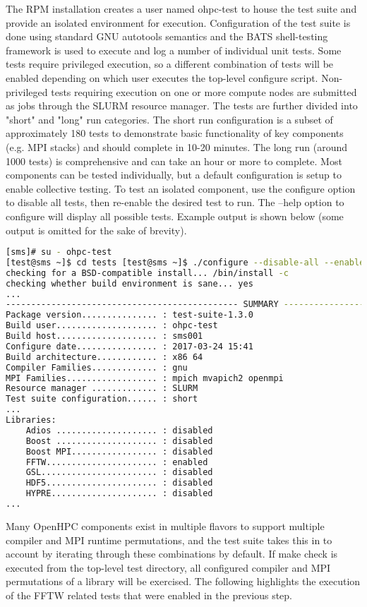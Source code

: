 The RPM installation creates a user named ohpc-test to house the test suite and provide an isolated environment for execution. Configuration of the test suite is done using standard GNU autotools semantics and the BATS shell-testing framework is used to execute and log a number of individual unit tests. Some tests require privileged execution, so a different combination of tests will be enabled depending on which user executes the top-level configure script. Non-privileged tests requiring execution on one or more compute nodes are submitted as jobs through the SLURM resource manager. The tests are further divided into "short" and "long" run categories. The short run configuration is a subset of approximately 180 tests to demonstrate basic functionality of key components (e.g. MPI stacks) and should complete in 10-20 minutes. The long run (around 1000 tests) is comprehensive and can take an hour or more to complete. Most components can be tested individually, but a default configuration is setup to enable collective testing. To test an isolated component, use the configure option to disable all tests, then re-enable the desired test to run. The --help option to configure will display all possible tests. Example output is shown below (some output is omitted for the sake of brevity).
\begin{lstlisting}[language=bash,keywords={},upquote=true]
[sms]# su - ohpc-test 
[test@sms ~]$ cd tests [test@sms ~]$ ./configure --disable-all --enable-fftw 
checking for a BSD-compatible install... /bin/install -c 
checking whether build environment is sane... yes 
... 
---------------------------------------------- SUMMARY --------------------------------------------
Package version............... : test-suite-1.3.0
Build user.................... : ohpc-test 
Build host.................... : sms001 
Configure date................ : 2017-03-24 15:41 
Build architecture............ : x86 64 
Compiler Families............. : gnu 
MPI Families.................. : mpich mvapich2 openmpi 
Resource manager ............. : SLURM 
Test suite configuration...... : short 
... 
Libraries: 
	Adios .................... : disabled 
	Boost .................... : disabled 
	Boost MPI................. : disabled 
	FFTW...................... : enabled 
	GSL....................... : disabled 
	HDF5...................... : disabled 
	HYPRE..................... : disabled 
...
\end{lstlisting}
	
Many OpenHPC components exist in multiple flavors to support multiple compiler and MPI runtime permutations, and the test suite takes this in to account by iterating through these combinations by default.
If make check is executed from the top-level test directory, all configured compiler and MPI permutations of a library will be exercised. The following highlights the execution of the FFTW related tests that were enabled in the previous step.

